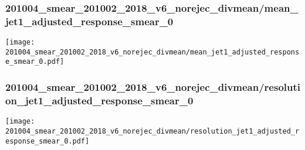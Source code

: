 \begin{frame}
   \frametitle{\small 201004\_smear\_201002\_2018\_v6\_norejec\_divmean/mean\_jet1\_adjusted\_response\_smear\_0}
   \centering
   \texttt{[image: 201004\_smear\_201002\_2018\_v6\_norejec\_divmean/mean\_jet1\_adjusted\_response\_smear\_0.pdf]}
\end{frame}

\begin{frame}
   \frametitle{\small 201004\_smear\_201002\_2018\_v6\_norejec\_divmean/resolution\_jet1\_adjusted\_response\_smear\_0}
   \centering
   \texttt{[image: 201004\_smear\_201002\_2018\_v6\_norejec\_divmean/resolution\_jet1\_adjusted\_response\_smear\_0.pdf]}
\end{frame}

